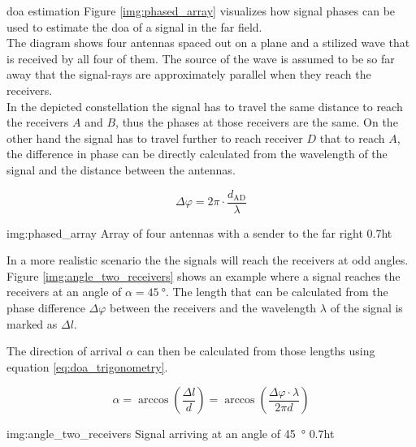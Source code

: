 \begin{subchapter}{\gls{doa} estimation}
  Figure \ref{img:phased_array} visualizes how signal phases
  can be used to estimate the \acrlong{doa} of a signal
  in the far field. \\

  The diagram shows four antennas spaced out on a plane
  and a stilized wave that is received by all four of them.
  The source of the wave is assumed to be so far away that
  the signal-rays are approximately parallel when
  they reach the receivers. \\

  In the depicted constellation the signal has to travel the
  same distance to reach the receivers $A$ and $B$, thus the
  phases at those receivers are the same.
  On the other hand the signal has to travel further to reach
  receiver $D$ that to reach $A$, the difference in phase can
  be directly calculated from the wavelength of the signal and
  the distance between the antennas.

  \begin{equation*}
    \Delta \varphi =  2 \pi \cdot \frac{d_\text{AD}}{\lambda}
  \end{equation*}

               {img:phased_array}
               {Array of four antennas with a sender to the far right}
               {0.7}{ht}

  In a more realistic scenario the the signals will reach the
  receivers at odd angles. Figure \ref{img:angle_two_receivers}
  shows an example where a signal reaches the receivers at an
  angle of $\alpha=\SI{45}{\degree}$. The length that can be calculated
  from the phase difference $\Delta \varphi$ between the receivers and
  the wavelength $\lambda$ of the signal is marked as $\Delta l$.

  The direction of arrival $\alpha$ can then be calculated from
  those lengths using equation \ref{eq:doa_trigonometry}.

  \begin{equation}
    \label{eq:doa_trigonometry}
    \alpha
    = \arccos \left( \frac{\Delta l}{d} \right)
    = \arccos \left( \frac{\Delta \varphi \cdot \lambda}{2 \pi d} \right)
  \end{equation}

               {img:angle_two_receivers}
               {Signal arriving at an angle of \SI{45}{\degree}}
               {0.7}{ht}
\end{subchapter}


